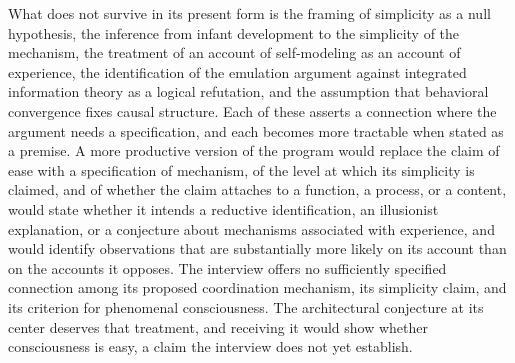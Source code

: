 \documentclass[11pt]{article}
\begin{document}
What does not survive in its present form is the framing of simplicity as a null hypothesis, the inference from infant development to the simplicity of the mechanism, the treatment of an account of self-modeling as an account of experience, the identification of the emulation argument against integrated information theory as a logical refutation, and the assumption that behavioral convergence fixes causal structure. Each of these asserts a connection where the argument needs a specification, and each becomes more tractable when stated as a premise. A more productive version of the program would replace the claim of ease with a specification of mechanism, of the level at which its simplicity is claimed, and of whether the claim attaches to a function, a process, or a content, would state whether it intends a reductive identification, an illusionist explanation, or a conjecture about mechanisms associated with experience, and would identify observations that are substantially more likely on its account than on the accounts it opposes. The interview offers no sufficiently specified connection among its proposed coordination mechanism, its simplicity claim, and its criterion for phenomenal consciousness. The architectural conjecture at its center deserves that treatment, and receiving it would show whether consciousness is easy, a claim the interview does not yet establish.
\end{document}
